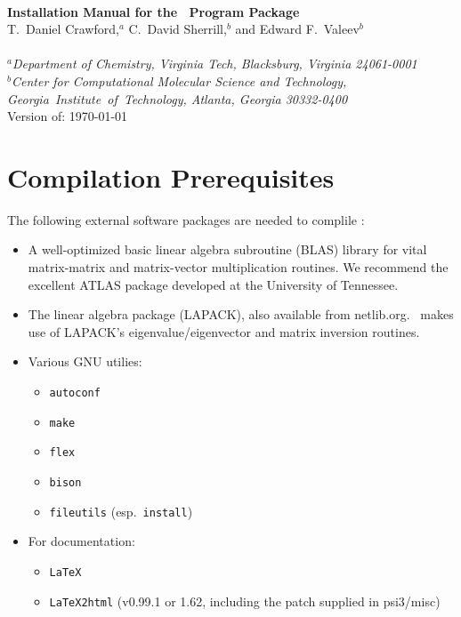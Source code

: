 \documentclass[12pt]{article}
\begin{document}


\begin{center}
\ \\
\vspace{2.0in}
{\bf {\Large Installation Manual for the \PSIthree\ Program Package}} \\
\vspace{0.5in}
T.\ Daniel Crawford,$^a$ C.\ David Sherrill,$^b$ and Edward F.\ Valeev$^b$ \\
\ \\
{\em $^a$Department of Chemistry, Virginia Tech, Blacksburg, Virginia 24061-0001} \\
\vspace{0.1in}
{\em $^b$Center for Computational Molecular Science and Technology, \mbox{Georgia 
Institute of Technology,} Atlanta, Georgia 30332-0400} 
\ \\
\vspace{0.3in}
Version of: \today
\end{center}

\thispagestyle{empty}

\newpage
\section{Compilation Prerequisites}

The following external software packages are needed to complile \PSIthree:
\begin{itemize}
\item A well-optimized basic linear algebra subroutine (BLAS) library
  for vital matrix-matrix and matrix-vector multiplication routines.
  We recommend the excellent ATLAS package developed at the University
  of Tennessee.  
\item The linear algebra package (LAPACK), also available from
  netlib.org.  \PSIthree\ makes use of LAPACK's eigenvalue/eigenvector
  and matrix inversion routines.  
\item Various GNU utilies: 
\begin{itemize}
\item {\tt autoconf}
\item {\tt make}
\item {\tt flex}
\item {\tt bison}
\item {\tt fileutils} (esp.\ {\tt install})
\end{itemize}
\item For documentation:
\begin{itemize}
\item {\tt LaTeX}
\item {\tt LaTeX2html} (v0.99.1 or 1.62, including the patch supplied in
psi3/misc)
\end{itemize}
\end{itemize}
\end{document}
